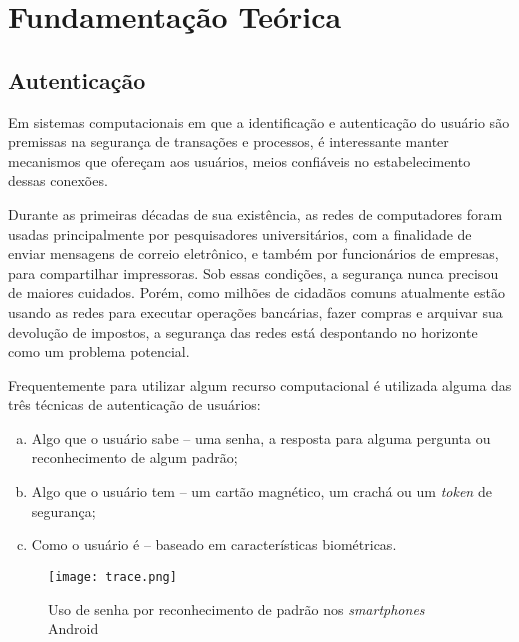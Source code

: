 \chapter{Fundamentação Teórica}\label{cha:fundamentacao}
\section{Autenticação}
Em sistemas computacionais em que a identificação e autenticação do usuário são premissas na segurança de transações e processos, é interessante manter mecanismos que ofereçam aos usuários, meios confiáveis no estabelecimento dessas conexões.
\begin{citacao}
Durante as primeiras décadas de sua existência, as redes de computadores foram usadas principalmente por pesquisadores universitários, com a finalidade de enviar mensagens de correio eletrônico, e também por funcionários de empresas, para compartilhar impressoras. Sob essas condições, a segurança nunca precisou de maiores cuidados. Porém, como milhões de cidadãos comuns atualmente estão usando as redes para executar operações bancárias, fazer compras e arquivar sua devolução de impostos, a segurança das redes está despontando no horizonte como um problema potencial.\cite{tanenbaum2011computer}
\end{citacao}
Frequentemente para utilizar algum recurso computacional é utilizada alguma das três técnicas de autenticação de usuários:

\begin{footnotesize}
	\begin{enumerate}[(a)]
	\item Algo que o usuário sabe – uma senha, a resposta para alguma pergunta ou reconhecimento de algum padrão;
	\item Algo que o usuário tem – um cartão magnético, um crachá ou um \textit{token} de segurança;
	\item Como o usuário é – baseado em características biométricas.
	\end{enumerate}
\end{footnotesize}

\begin{figure}[!htb]
	\centering
	\texttt{[image: trace.png]} %
	\small
	\caption[Uso de senha por reconhecimento de padrão]{Uso de senha por reconhecimento de padrão nos \textit{smartphones} Android}
	\label{fig:trace}
\end{figure}

